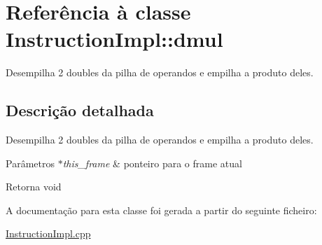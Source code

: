 \hypertarget{class_instruction_impl_1_1dmul}{}\section{Referência à classe Instruction\+Impl\+:\+:dmul}
\label{class_instruction_impl_1_1dmul}


Desempilha 2 doubles da pilha de operandos e empilha a produto deles.  




\subsection{Descrição detalhada}
Desempilha 2 doubles da pilha de operandos e empilha a produto deles. 


\begin{DoxyParams}{Parâmetros}
{\em $\ast$this\+\_\+frame} & ponteiro para o frame atual \\
\hline
\end{DoxyParams}
\begin{DoxyReturn}{Retorna}
void 
\end{DoxyReturn}


A documentação para esta classe foi gerada a partir do seguinte ficheiro\+:\begin{DoxyCompactItemize}
\item 
\hyperlink{_instruction_impl_8cpp}{Instruction\+Impl.\+cpp}\end{DoxyCompactItemize}
